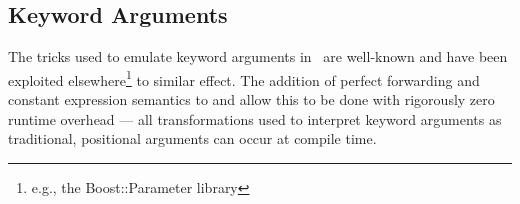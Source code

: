\subsection{Keyword Arguments}
\label{sec:kwargs}
The tricks used to emulate \glspl{keyword argument} in \CC\ are well-known and have been
exploited elsewhere\footnote{e.g., the Boost::Parameter library} to similar
effect.  The addition of perfect forwarding and constant expression semantics to
 and  allow this to be done with rigorously zero runtime overhead ---
all transformations used to interpret \glspl{keyword argument} as traditional,
positional arguments can occur at compile time.
